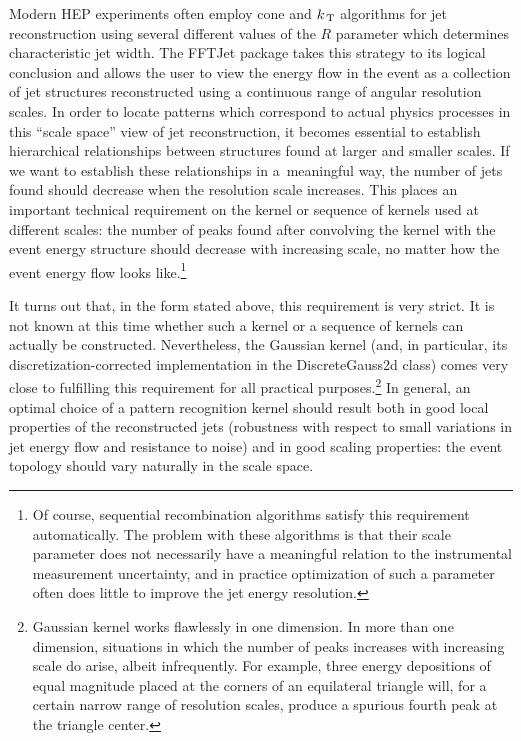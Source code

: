 \documentclass[epsf,12pt,titlepage]{article}
\newcommand{\sub}[1]{\ensuremath{_{\mbox{\scriptsize \,#1}}}}
\def\KT {\mbox{$k\sub{T}$} }
\newcommand{\cname}[1]{\index{#1}\textsf{#1}}
\begin{document}
Modern HEP experiments often employ cone and \KT algorithms 
for jet reconstruction using several different values of the $R$
parameter which determines characteristic jet width. The FFTJet package
takes this strategy to its logical conclusion and allows
the user to view the energy flow in the event as a collection
of jet structures reconstructed using a continuous range of
angular resolution scales. In order to locate patterns which
correspond to actual physics processes in this ``scale space''
view of jet reconstruction, it becomes essential
to establish hierarchical
relationships between structures found at larger and smaller scales.
If we want to establish these relationships in a~meaningful way,
the number of jets found should decrease when the resolution
scale increases. This places an important technical requirement
on the kernel or sequence of kernels used at different scales:
the number of peaks found after convolving the kernel with
the event energy structure should
decrease with increasing scale, no matter how the event energy
flow looks like.\footnote{Of course, sequential recombination
algorithms satisfy this requirement automatically. The problem
with these algorithms is that their scale parameter does
not necessarily have a meaningful relation to the instrumental
measurement uncertainty, and in practice optimization of such a parameter
often does little to improve the jet energy resolution.}

It turns out that, in the form stated above, this requirement is very strict.
It is not known at this time whether such a kernel or a sequence
of kernels can actually be constructed. Nevertheless,
the Gaussian kernel (and, in particular, its 
discretization-corrected implementation
in the \cname{DiscreteGauss2d} class)
comes very close to fulfilling this requirement
for all practical purposes.\footnote{Gaussian kernel works flawlessly
in one dimension. In more
than one dimension, situations in which the number
of peaks increases with increasing scale do arise, albeit infrequently.
For example, three 
energy depositions of equal magnitude placed at the corners
of an equilateral triangle will,
for a certain narrow range of resolution scales,
produce a spurious fourth peak at the triangle center.}
In general, an optimal choice of a pattern recognition kernel should
result both in good local properties of the reconstructed jets
(robustness with respect to small variations in jet energy flow and
resistance to noise) and in good scaling properties: the
event topology should vary naturally in the scale space.
\end{document}
